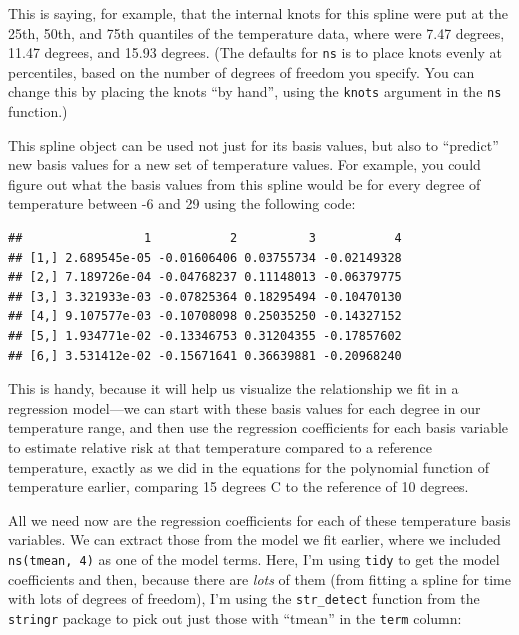 \documentclass[
]{book}
\newenvironment{Shaded}{\begin{snugshade}}{\end{snugshade}}
\newcommand{\DataTypeTok}[1]{\textcolor[rgb]{0.13,0.29,0.53}{#1}}
\newcommand{\DecValTok}[1]{\textcolor[rgb]{0.00,0.00,0.81}{#1}}
\newcommand{\KeywordTok}[1]{\textcolor[rgb]{0.13,0.29,0.53}{\textbf{#1}}}
\newcommand{\NormalTok}[1]{#1}
\newcommand{\OperatorTok}[1]{\textcolor[rgb]{0.81,0.36,0.00}{\textbf{#1}}}
\newcommand{\StringTok}[1]{\textcolor[rgb]{0.31,0.60,0.02}{#1}}
\begin{document}
This is saying, for example, that the internal knots for this spline were put at the
25th, 50th, and 75th quantiles of the temperature data, where were 7.47 degrees, 11.47 degrees,
and 15.93 degrees. (The defaults for \texttt{ns} is to place knots evenly at percentiles, based
on the number of degrees of freedom you specify. You can change this by placing the knots
``by hand'', using the \texttt{knots} argument in the \texttt{ns} function.)

This spline object can be used not just for its basis values, but also to ``predict'' new
basis values for a new set of temperature values. For example, you could figure out
what the basis values from this spline would be for every degree of temperature between
-6 and 29 using the following code:

\begin{Shaded}
\end{Shaded}

\begin{verbatim}
##                 1           2          3           4
## [1,] 2.689545e-05 -0.01606406 0.03755734 -0.02149328
## [2,] 7.189726e-04 -0.04768237 0.11148013 -0.06379775
## [3,] 3.321933e-03 -0.07825364 0.18295494 -0.10470130
## [4,] 9.107577e-03 -0.10708098 0.25035250 -0.14327152
## [5,] 1.934771e-02 -0.13346753 0.31204355 -0.17857602
## [6,] 3.531412e-02 -0.15671641 0.36639881 -0.20968240
\end{verbatim}

This is handy, because it will help us visualize the relationship we fit in a regression
model---we can start with these basis values for each degree in our temperature range, and
then use the regression coefficients for each basis variable to estimate relative risk
at that temperature compared to a reference temperature, exactly as we did in the equations
for the polynomial function of temperature earlier, comparing 15 degrees C to the reference
of 10 degrees.

All we need now are the regression coefficients for each of these temperature basis
variables. We can extract those from the model we fit earlier, where we included
\texttt{ns(tmean,\ 4)} as one of the model terms. Here, I'm using \texttt{tidy} to get the model
coefficients and then, because there are \emph{lots} of them (from fitting a spline for
time with lots of degrees of freedom), I'm using the \texttt{str\_detect} function from the
\texttt{stringr} package to pick out just those with ``tmean'' in the \texttt{term} column:
\end{document}
